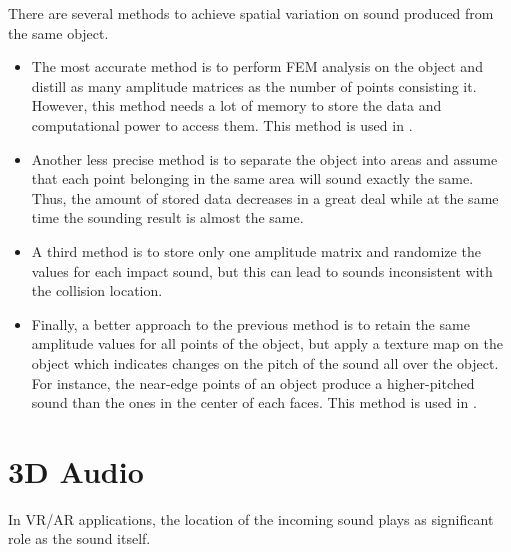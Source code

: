 There are several methods to achieve spatial variation on sound produced from the same object. 
\begin{itemize}
\item The most accurate method is to perform FEM analysis on the object and distill as many amplitude matrices as the number of points consisting it. However, this method needs a lot of memory to store the data and computational power to access them. This method is used in \cite{o2002synthesizing}.
\item Another less precise method is to separate the object into areas and assume that each point belonging in the same area will sound exactly the same. Thus, the amount of stored data decreases in a great deal while at the same time the sounding result is almost the same.
\item A third method is to store only one amplitude matrix and randomize the values for each impact sound, but this can lead to sounds inconsistent with the collision location. 
\item Finally, a better approach to the previous method is to retain the same amplitude values for all points of the object, but apply a texture map on the object which indicates changes on the pitch of the sound all over the object. For instance, the near-edge points of an object produce a higher-pitched sound than the ones in the center of each faces. This method is used in \cite{lloyd2011sound}. 
\end{itemize}

\section{3D Audio}
In VR/AR applications, the location of the incoming sound plays as significant role as the sound itself. 

